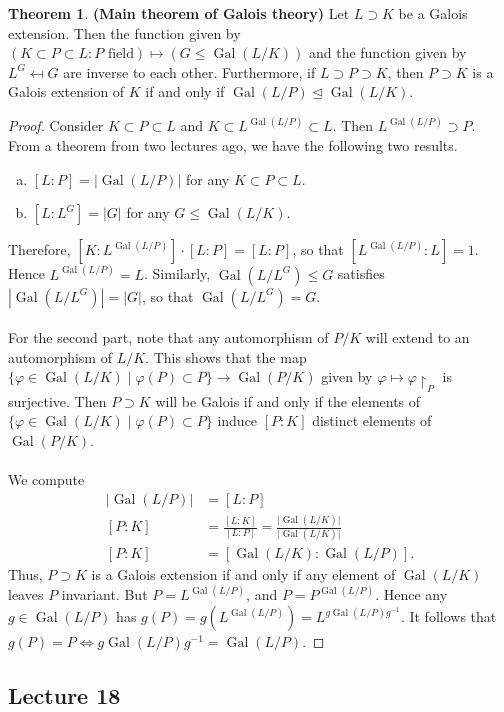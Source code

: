 \documentclass[10pt,letterpaper,cm]{nupset}
\theoremstyle{definition}
\newtheorem{theorem}{Theorem}
\newcommand{\1}{\mathbf{1}}
\newcommand{\0}{\vec 0}
\DeclareMathOperator{\gal}{Gal}
\begin{document}
\begin{theorem}{\textbf{(Main theorem of Galois theory)}}
Let $L \supset K$ be a Galois extension. Then the function given by $(K \subset P \subset L : P \text{ field}) \mapsto (G \leq \gal(L/K))$ and the function given by $L^G \mapsfrom G$ are inverse to each other. Furthermore, if $L \supset P \supset K$, then $P \supset K$ is a Galois extension of $K$ if and only if $\gal(L/P) \unlhd \gal(L/K)$. 
\end{theorem}
\begin{proof}
Consider $K \subset P \subset L$ and $K \subset L^{\gal(L/P)} \subset L$. Then $L^{\gal(L/P)}\supset P$. From a theorem from two lectures ago, we have the following two results.
\begin{enumerate}[(a)]
\item $[L:P] = |\gal(L/P)|$ for any $K \subset P \subset L$. 
\item $[L: L^G] = |G|$ for any $G \leq \gal(L/K)$. 
\end{enumerate}
Therefore, $[K: L^{\gal(L/P)}]\cdot [L:P] = [L:P]$, so that $[L^{\gal(L/P)} : L]= 1$. Hence $L^{\gal(L/P)} = L$. Similarly, $\gal(L/L^G) \leq G$ satisfies $|\gal(L/L^G)| = |G|$, so that $\gal(L/L^G) = G$. 
\\ \\
For the second part, note that any automorphism of $P/K$ will extend to an automorphism of $L/K$. This shows that the map $\{\varphi \in \gal(L/K) \mid \varphi(P) \subset P\} \to \gal(P/K)$ given by $\varphi \mapsto \varphi \restriction_P$ is surjective. Then $P \supset K$ will be Galois if and only if the elements of $\{\varphi \in \gal(L/K) \mid \varphi(P) \subset P\}$ induce $[P:K]$ distinct elements of $\gal(P/K)$. 
\\ \\
We compute
\begin{align*}
|\gal(L/P)| & = [L:P]
\\ [P:K] & = \frac{[L:K]}{[L:P]} = \frac{\lvert{\gal(L/K)}\rvert}{\lvert{\gal(L/K)}\rvert}
\\ [P:K] & = [\gal(L/K) : \gal(L/P)].
\end{align*}
Thus, $P \supset K$ is a Galois extension if and only if any element of $\gal(L/K)$ leaves $P$ invariant. But $P = L^{\gal(L/P)}$, and $P = P^{\gal(L/P)}$. Hence any $g \in \gal(L/P)$ has $g(P) = g(L^{\gal(L/P)}) = L^{g\gal(L/P)g^{-1}}$. It follows that $g(P) = P \iff g\gal(L/P)g^{-1} = \gal(L/P)$.
\end{proof}

\subsection{Lecture 18}
\end{document}
